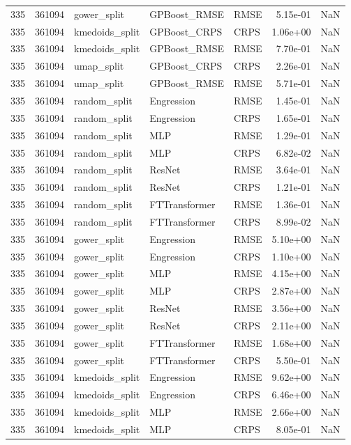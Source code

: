 \begin{tabular}{rrlllrr}
335 & 361094 & gower\_split & GPBoost\_RMSE & RMSE & 5.15e-01 & NaN \\
335 & 361094 & kmedoids\_split & GPBoost\_CRPS & CRPS & 1.06e+00 & NaN \\
335 & 361094 & kmedoids\_split & GPBoost\_RMSE & RMSE & 7.70e-01 & NaN \\
335 & 361094 & umap\_split & GPBoost\_CRPS & CRPS & 2.26e-01 & NaN \\
335 & 361094 & umap\_split & GPBoost\_RMSE & RMSE & 5.71e-01 & NaN \\
335 & 361094 & random\_split & Engression & RMSE & 1.45e-01 & NaN \\
335 & 361094 & random\_split & Engression & CRPS & 1.65e-01 & NaN \\
335 & 361094 & random\_split & MLP & RMSE & 1.29e-01 & NaN \\
335 & 361094 & random\_split & MLP & CRPS & 6.82e-02 & NaN \\
335 & 361094 & random\_split & ResNet & RMSE & 3.64e-01 & NaN \\
335 & 361094 & random\_split & ResNet & CRPS & 1.21e-01 & NaN \\
335 & 361094 & random\_split & FTTransformer & RMSE & 1.36e-01 & NaN \\
335 & 361094 & random\_split & FTTransformer & CRPS & 8.99e-02 & NaN \\
335 & 361094 & gower\_split & Engression & RMSE & 5.10e+00 & NaN \\
335 & 361094 & gower\_split & Engression & CRPS & 1.10e+00 & NaN \\
335 & 361094 & gower\_split & MLP & RMSE & 4.15e+00 & NaN \\
335 & 361094 & gower\_split & MLP & CRPS & 2.87e+00 & NaN \\
335 & 361094 & gower\_split & ResNet & RMSE & 3.56e+00 & NaN \\
335 & 361094 & gower\_split & ResNet & CRPS & 2.11e+00 & NaN \\
335 & 361094 & gower\_split & FTTransformer & RMSE & 1.68e+00 & NaN \\
335 & 361094 & gower\_split & FTTransformer & CRPS & 5.50e-01 & NaN \\
335 & 361094 & kmedoids\_split & Engression & RMSE & 9.62e+00 & NaN \\
335 & 361094 & kmedoids\_split & Engression & CRPS & 6.46e+00 & NaN \\
335 & 361094 & kmedoids\_split & MLP & RMSE & 2.66e+00 & NaN \\
335 & 361094 & kmedoids\_split & MLP & CRPS & 8.05e-01 & NaN \\

\end{tabular}
